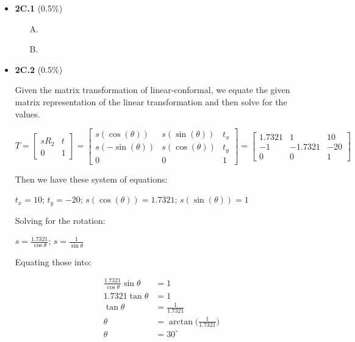 \documentclass{article}
\begin{document}
	\begin{itemize}
		\item{\textbf{2C.1} (0.5\%)}
			{
				\begin{itemize}
					\item[A.] 


					\item[B.]

				\end{itemize}
			}
		
		\item{\textbf{2C.2} (0.5\%)}
			
						Given the matrix transformation of linear-conformal, we equate the given matrix representation of the linear transformation and then solve for the values.

						$
							T = \begin{bmatrix}
  									sR_2 & t \\
  									0 & 1
									\end{bmatrix}
								= \begin{bmatrix}
									s(\cos(\theta))  & s(\sin(\theta)) & t_x \\
									s(-\sin(\theta)) & s(\cos(\theta)) & t_y \\
									0 & 0 & 1
									\end{bmatrix}
								= \begin{bmatrix}
									1.7321 	& 1 		  & 10 	\\
									-1 		  & -1.7321	& -20 \\
									0       & 0       & 1
								\end{bmatrix}
						$

						Then we have these system of equations:

						$t_x = 10$; $t_y = -20$; $s(\cos(\theta)) = 1.7321$; $s(\sin(\theta)) = 1$

						Solving for the rotation:

						$s = \frac{1.7321}{\cos\theta}$; $s = \frac{1}{\sin\theta}$

						Equating those into:
						
						\begin{align*}
							\frac{1.7321}{\cos\theta}\sin\theta & = 1 \\
							1.7321\tan\theta                    & = 1 \\
							\tan\theta                          & = \frac{1}{1.7321} \\
							\theta                              & = \arctan({\frac{1}{1.7321})} \\
							\theta                              & = 30^{\circ}
						\end{align*}


\end{itemize}
\end{document}

